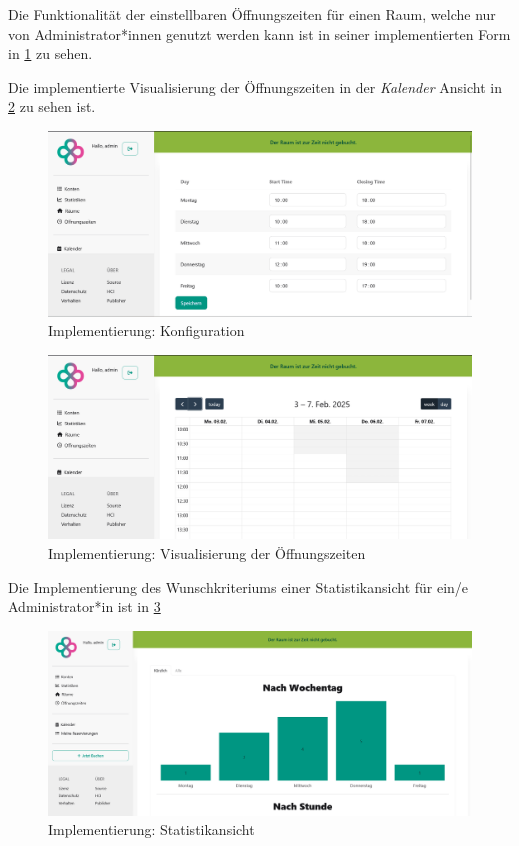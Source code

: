 Die Funktionalität der einstellbaren Öffnungszeiten für einen Raum, welche nur von Administrator*innen genutzt werden kann
ist in seiner implementierten Form in \ref{fig:impl-adminopeninghours_config} zu sehen.

Die implementierte Visualisierung der Öffnungszeiten in der \textit{Kalender} Ansicht in \ref{fig:impl-adminopeninghours} zu sehen ist.

\begin{figure}[ht]
    \centering
    \includegraphics[width=\textwidth]{figures/impl-views/set_opening_hours_light}
    \caption{Implementierung: Konfiguration}
    \label{fig:impl-adminopeninghours_config}
\end{figure}
\begin{figure}[ht]
    \centering
    \includegraphics[width=\textwidth]{figures/impl-views/opening_hours_calendar_light}
    \caption{Implementierung: Visualisierung der Öffnungszeiten}
    \label{fig:impl-adminopeninghours}
\end{figure}
\clearpage

Die Implementierung des Wunschkriteriums einer Statistikansicht für ein/e Administrator*in ist in \ref{fig:impl-adminstatistic}

\begin{figure}[ht]
    \centering
    \includegraphics[width=\textwidth]{figures/impl-views/stats_light}
    \caption{Implementierung: Statistikansicht}
    \label{fig:impl-adminstatistic}
\end{figure}